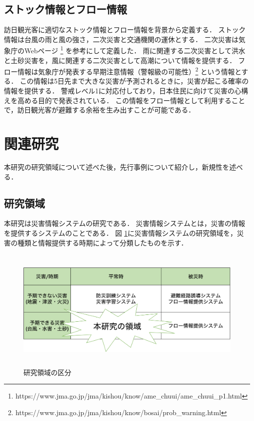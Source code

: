 \documentclass[a4paper,11pt,oneside,openany]{jsbook}
\begin{document}
\subsection{ストック情報とフロー情報}
訪日観光客に適切なストック情報とフロー情報を背景から定義する．
ストック情報は台風の雨と風の強さ，二次災害と交通機関の運休とする．
二次災害は気象庁のWebページ \footnote{https://www.jma.go.jp/jma/kishou/know/ame\_chuui/ame\_chuui\_p1.html} を参考にして定義した．
雨に関連する二次災害として洪水と土砂災害を，風に関連する二次災害として高潮について情報を提供する．
フロー情報は気象庁が発表する早期注意情報（警報級の可能性）\footnote{https://www.jma.go.jp/jma/kishou/know/bosai/prob\_warning.html} という情報とする．
この情報は5日先まで大きな災害が予測されるときに，災害が起こる確率の情報を提供する．
警戒レベル1に対応付しており，日本住民に向けて災害の心構えを高める目的で発表されている．
この情報をフロー情報として利用することで，訪日観光客が避難する余裕を生み出すことが可能である．

\section{関連研究}
本研究の研究領域について述べた後，先行事例について紹介し，新規性を述べる．

\subsection{研究領域}
本研究は災害情報システムの研究である．
災害情報システムとは，災害の情報を提供するシステムのことである．
図 \ref{fig:reasearch_area}に災害情報システムの研究領域を，災害の種類と情報提供する時期によって分類したものを示す．

\begin{figure}[H]
  \centering
  \includegraphics[height=6cm]{./fig/research_area.png}
  \caption{研究領域の区分}
  \label{fig:reasearch_area}
\end{figure}
\end{document}
